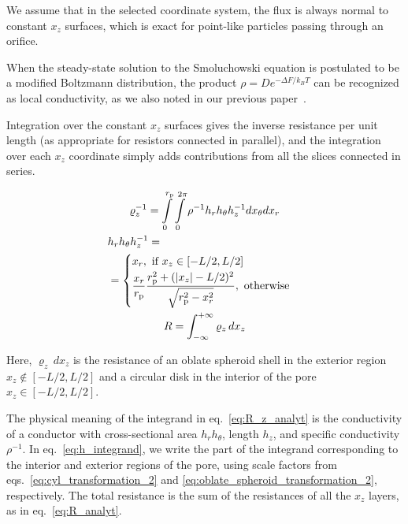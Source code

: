 \documentclass[10pt, a4paper]{article}
\begin{document}
\begin{multicols}{2}
We assume that in the selected coordinate system, the flux is always normal to constant $x_z$ surfaces, which is exact for point-like particles passing through an orifice.

When the steady-state solution to the Smoluchowski equation is postulated to be a modified Boltzmann distribution, the product $\rho = D e^{-\Delta F / k_B T}$ can be recognized as local conductivity, as we also noted in our previous paper~\cite{Laktionov2023}.

Integration over the constant $x_z$ surfaces gives the inverse resistance per unit length (as appropriate for resistors connected in parallel), and the integration over each $x_z$ coordinate simply adds contributions from all the slices connected in series.

\begin{gather}
    \label{eq:R_z_analyt}
    \varrho_{z}^{-1} = \int\displaylimits_{0}^{r_{\text{p}}} \int\displaylimits_{0}^{2\pi} \rho^{-1} h_r h_{\theta} h_z^{-1} dx_{\theta} dx_r
    \\
    \label{eq:h_integrand}
    \begin{aligned} 
        &h_r h_{\theta} h_z^{-1} = \\ &=
        \begin{cases}
            x_r, \text{ if } x_z \in [-L/2,L/2]
            \\[2pt]
            \dfrac{x_r}{r_{\text{p}}}\dfrac{r_{\text{p}}^2 + (|x_z|-L/2)^2}{\sqrt{r_{\text{p}}^2 - x_r^2}}, \text{ otherwise}
        \end{cases}
    \end{aligned}
    \\
    \label{eq:R_analyt}
    R = \int_{-\infty}^{+\infty} \varrho_{z} \, dx_z
\end{gather}

Here, $\varrho_{z} \, dx_z$ is the resistance of an oblate spheroid shell in the exterior region $x_z \notin [-L/2, L/2]$ and a circular disk in the interior of the pore $x_z \in [-L/2, L/2]$.

The physical meaning of the integrand in eq.~\ref{eq:R_z_analyt} is the conductivity of a conductor with cross-sectional area $h_r h_{\theta}$, length $h_z$, and specific conductivity $\rho^{-1}$.
In eq.~\ref{eq:h_integrand}, we write the part of the integrand corresponding to the interior and exterior regions of the pore, using scale factors from eqs.~\ref{eq:cyl_transformation_2} and \ref{eq:oblate_spheroid_transformation_2}, respectively.
The total resistance is the sum of the resistances of all the $x_z$ layers, as in eq.~\ref{eq:R_analyt}.


\end{multicols}
\end{document}
